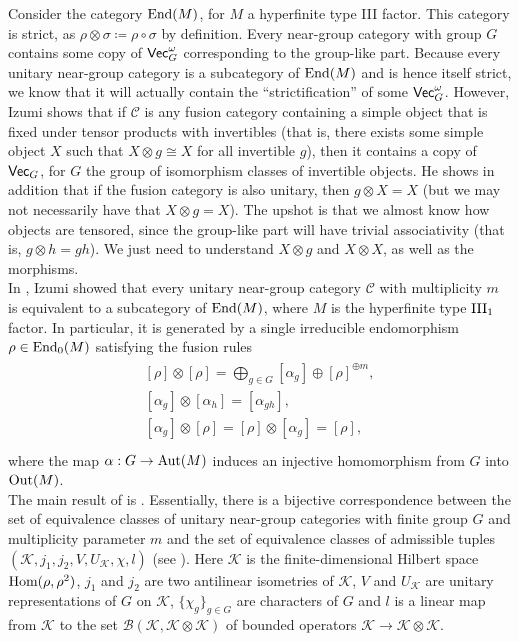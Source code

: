 \noindent Consider the category $\textup{End}(M)$, for $M$ a hyperfinite type III factor. This category is strict, as $\rho \otimes \sigma \coloneqq \rho \circ \sigma$ by definition. Every near-group category with group $G$ contains some copy of $\textup{\textsf{Vec}}_G^\omega$ corresponding to the group-like part. Because every unitary near-group category is a subcategory of $\textup{End}(M)$ and is hence itself strict, we know that it will actually contain the ``strictification'' of some $\textup{\textsf{Vec}}_G^\omega$. However, Izumi shows that if $\mathcal{C}$ is any fusion category containing a simple object that is fixed under tensor products with invertibles (that is, there exists some simple object $X$ such that $X \otimes g \cong X$ for all invertible $g$), then it contains a copy of $\textup{\textsf{Vec}}_G$, for $G$ the group of isomorphism classes of invertible objects. He shows in addition that if the fusion category is also unitary, then $g \otimes X = X$ (but we may not necessarily have that $X \otimes g = X$). The upshot is that we almost know how objects are tensored, since the group-like part will have trivial associativity (that is, $g \otimes h = gh$). We just need to understand $X \otimes g$ and $X \otimes X$, as well as the morphisms.\\

\noindent In \cite{Izu17}, Izumi showed that every unitary near-group category $\mathcal{C}$ with multiplicity $m$ is equivalent to a subcategory of $\textup{End}(M)$, where $M$ is the hyperfinite type $\textup{III}_1$ factor. In particular, it is generated by a single irreducible endomorphism $\rho \in \textup{End}_0(M)$ satisfying the fusion rules
\begin{align*}
\begin{split}
[\rho] \otimes [\rho] = \bigoplus_{g \in G} [\alpha_g] \oplus [\rho]^{\oplus m},\\
[\alpha_g] \otimes [\alpha_h] = [\alpha_{gh}],\\
[\alpha_g] \otimes [\rho] = [\rho] \otimes [\alpha_g] = [\rho],\\
\end{split}
\end{align*}
where the map $\alpha : G \to \textup{Aut}(M)$ induces an injective homomorphism from $G$ into $\textup{Out}(M)$.\\

\noindent The main result of \cite{Izu17} is \cite[Theorem 4.9]{Izu17}. Essentially, there is a bijective correspondence between the set of equivalence classes of unitary near-group categories with finite group $G$ and multiplicity parameter $m$ and the set of equivalence classes of admissible tuples $(\mathcal{K}, j_1, j_2, V, U_\mathcal{K}, \chi, l)$ (see \cite[Definition 4.8]{Izu17}). Here $\mathcal{K}$ is the finite-dimensional Hilbert space $\textup{Hom}(\rho, \rho^2)$, $j_1$ and $j_2$ are two antilinear isometries of $\mathcal{K}$, $V$ and $U_\mathcal{K}$ are unitary representations of $G$ on $\mathcal{K}$, $\{\chi_g\}_{g \in G}$ are characters of $G$ and $l$ is a linear map from $\mathcal{K}$ to the set $\mathcal{B}(\mathcal{K}, \mathcal{K} \otimes \mathcal{K})$ of bounded operators $\mathcal{K} \to \mathcal{K} \otimes \mathcal{K}$.\newpage


